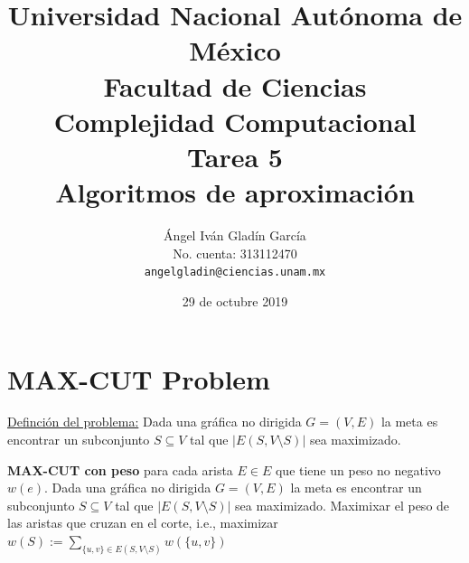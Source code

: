 \documentclass[letterpaper]{article}
\begin{document}
\title{
        Universidad Nacional Autónoma de México\\
        Facultad de Ciencias\\
        Complejidad Computacional\\
    \vspace{1cm}
    \large
        \textbf{Tarea 5}\\
        \textbf{Algoritmos de aproximación}
}
\author{
    Ángel Iván Gladín García\\
    No. cuenta: 313112470\\
    \texttt{angelgladin@ciencias.unam.mx}
}
\date{29 de octubre 2019}
\maketitle

\newtheorem{theorem}{Teorema}
\newtheorem{example}{Ejemplo}
\newtheorem{corollary}{Corolario}
\newtheorem{lemma}{Lemma}
\newtheorem{definition}{Definicion}
\newtheorem{prop}{Proposicion}


\section{MAX-CUT Problem}
\underline{Definción del problema:} Dada una gráfica no dirigida $G=(V,E)$ la meta es encontrar un
subconjunto $S \subseteq V$ tal que $|E(S, V\setminus S)|$ sea maximizado.

\textbf{MAX-CUT con peso} para cada arista $E \in E$ que tiene un peso no negativo $w(e)$.
Dada una gráfica no dirigida $G=(V,E)$ la meta es encontrar un
subconjunto $S \subseteq V$ tal que $|E(S, V\setminus S)|$ sea maximizado. Maximixar el peso de las
aristas que cruzan en el corte, i.e., maximizar
$w(S) := \sum_{\{ u,v \} \in E(S, V\setminus S)} w(\{ u,v \})$
\end{document}

